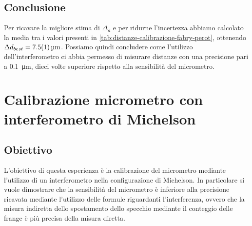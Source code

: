 \documentclass[a4paper]{article}
\begin{document}
\subsection{Conclusione}
Per ricavare la migliore stima di $\Delta_d$ e per ridurne l'incertezza abbiamo calcolato la media tra i valori presenti in \cref{tab:distanze-calibrazione-fabry-perot}, ottenendo $\Delta d_{best} = \SI{7.5 \pm 0.1}{\micro\meter}$. Possiamo quindi concludere come l'utilizzo dell'interferometro ci abbia permesso di misurare distanze con una precisione pari a \SI{0.1}{\micro\meter}, dieci volte superiore rispetto alla sensibilità del micrometro.


\section{Calibrazione micrometro con interferometro di Michelson}
\subsection{Obiettivo}
L'obiettivo di questa esperienza è la calibrazione del micrometro mediante l'utilizzo di un interferometro nella configurazione di Michelson. In particolare si vuole dimostrare che la sensibilità del micrometro è inferiore alla precisione ricavata mediante l'utilizzo delle formule riguardanti l'interferenza, ovvero che la misura indiretta dello spostamento dello specchio mediante il conteggio delle frange è più precisa della misura diretta.
\end{document}
